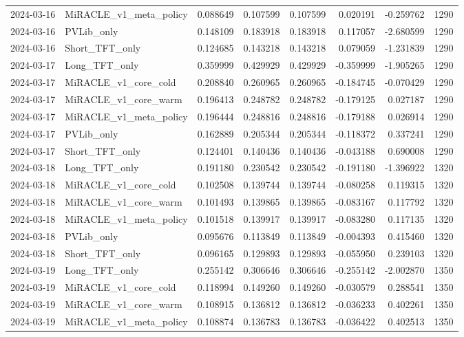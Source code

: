 \begin{tabular}{llrrrrrr}
2024-03-16 & MiRACLE_v1_meta_policy & 0.088649 & 0.107599 & 0.107599 & 0.020191 & -0.259762 & 1290 \\
2024-03-16 & PVLib_only & 0.148109 & 0.183918 & 0.183918 & 0.117057 & -2.680599 & 1290 \\
2024-03-16 & Short_TFT_only & 0.124685 & 0.143218 & 0.143218 & 0.079059 & -1.231839 & 1290 \\
2024-03-17 & Long_TFT_only & 0.359999 & 0.429929 & 0.429929 & -0.359999 & -1.905265 & 1290 \\
2024-03-17 & MiRACLE_v1_core_cold & 0.208840 & 0.260965 & 0.260965 & -0.184745 & -0.070429 & 1290 \\
2024-03-17 & MiRACLE_v1_core_warm & 0.196413 & 0.248782 & 0.248782 & -0.179125 & 0.027187 & 1290 \\
2024-03-17 & MiRACLE_v1_meta_policy & 0.196444 & 0.248816 & 0.248816 & -0.179188 & 0.026914 & 1290 \\
2024-03-17 & PVLib_only & 0.162889 & 0.205344 & 0.205344 & -0.118372 & 0.337241 & 1290 \\
2024-03-17 & Short_TFT_only & 0.124401 & 0.140436 & 0.140436 & -0.043188 & 0.690008 & 1290 \\
2024-03-18 & Long_TFT_only & 0.191180 & 0.230542 & 0.230542 & -0.191180 & -1.396922 & 1320 \\
2024-03-18 & MiRACLE_v1_core_cold & 0.102508 & 0.139744 & 0.139744 & -0.080258 & 0.119315 & 1320 \\
2024-03-18 & MiRACLE_v1_core_warm & 0.101493 & 0.139865 & 0.139865 & -0.083167 & 0.117792 & 1320 \\
2024-03-18 & MiRACLE_v1_meta_policy & 0.101518 & 0.139917 & 0.139917 & -0.083280 & 0.117135 & 1320 \\
2024-03-18 & PVLib_only & 0.095676 & 0.113849 & 0.113849 & -0.004393 & 0.415460 & 1320 \\
2024-03-18 & Short_TFT_only & 0.096165 & 0.129893 & 0.129893 & -0.055950 & 0.239103 & 1320 \\
2024-03-19 & Long_TFT_only & 0.255142 & 0.306646 & 0.306646 & -0.255142 & -2.002870 & 1350 \\
2024-03-19 & MiRACLE_v1_core_cold & 0.118994 & 0.149260 & 0.149260 & -0.030579 & 0.288541 & 1350 \\
2024-03-19 & MiRACLE_v1_core_warm & 0.108915 & 0.136812 & 0.136812 & -0.036233 & 0.402261 & 1350 \\
2024-03-19 & MiRACLE_v1_meta_policy & 0.108874 & 0.136783 & 0.136783 & -0.036422 & 0.402513 & 1350 \\

\end{tabular}
